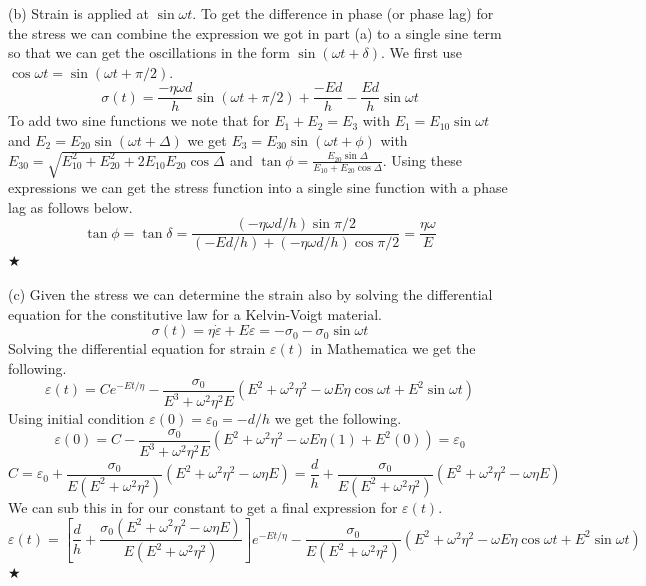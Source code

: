 \documentclass[preprint,12pt,authoryear]{elsarticle}
\begin{document}
(b) Strain is applied at $\sin{\omega t}$. To get the difference in phase (or phase lag) for the stress we can combine the expression we got in part (a) to a single sine term so that we can get the oscillations in the form $\sin{(\omega t + \delta)}$. We first use $\cos{\omega t} = \sin{(\omega t + \pi/2)}$.
\begin{equation}
    \sigma(t) = \frac{-\eta \omega d}{h}\sin{(\omega t + \pi/2)} + \frac{-Ed}{h} - \frac{Ed}{h}\sin{\omega t}
\end{equation}
To add two sine functions we note that for $E_1 + E_2 = E_3$ with $E_1 = E_{10}\sin{\omega t}$ and $E_2 = E_{20}\sin{(\omega t + \Delta)}$ we get $E_3 = E_{30}\sin{(\omega t + \phi)}$ with $E_{30} = \sqrt{E^2_{10} + E^2_{20} + 2E_{10}E_{20}\cos{\Delta}}$ and $\tan{\phi} = \frac{E_{20}\sin{\Delta}}{E_{10}+E_{20}\cos{\Delta}}$. Using these expressions we can get the stress function into a single sine function with a phase lag as follows below.
\begin{equation}
    \tan{\phi} = \tan{\delta} = \frac{(-\eta\omega d/h)\sin{\pi/2}}{(-Ed/h) + (-\eta\omega d/h)\cos{\pi/2}} = \frac{\eta\omega}{E}
\end{equation}
\hspace*{\fill} $\bigstar$
\medskip

(c) Given the stress we can determine the strain also by solving the differential equation for the constitutive law for a Kelvin-Voigt material.
\begin{equation}
    \sigma(t) = \eta \dot{\varepsilon} + E\varepsilon = -\sigma_0 - \sigma_0\sin{\omega t}
\end{equation}
Solving the differential equation for strain $\varepsilon(t)$ in Mathematica we get the following.
\begin{equation}
    \varepsilon(t) = Ce^{-Et/\eta} - \frac{\sigma_0}{E^3 + \omega^2 \eta^2E}(E^2 + \omega^2 \eta^2 - \omega E \eta \cos{\omega t} + E^2 \sin{\omega t})
\end{equation}
Using initial condition $\varepsilon(0) = \varepsilon_0 = -d/h$ we get the following.
\begin{equation}
    \varepsilon(0) = C - \frac{\sigma_0}{E^3 + \omega^2 \eta^2E}(E^2 + \omega^2 \eta^2 - \omega E \eta (1) + E^2 (0)) = \varepsilon_0
\end{equation}
\begin{equation}
    C = \varepsilon_0 +  \frac{\sigma_0}{E(E^2 + \omega^2 \eta^2)}(E^2 + \omega^2 \eta^2 - \omega\eta E) = \frac{d}{h} +  \frac{\sigma_0}{E(E^2 + \omega^2 \eta^2)}(E^2 + \omega^2 \eta^2 - \omega\eta E)
\end{equation}
We can sub this in for our constant to get a final expression for $\varepsilon(t)$.
\begin{equation}
     \varepsilon(t) =\left[ \frac{d}{h} +  \frac{\sigma_0 (E^2 + \omega^2 \eta^2 - \omega\eta E)}{E(E^2 + \omega^2 \eta^2)}\right]  e^{-Et/\eta} - \frac{\sigma_0}{E(E^2 + \omega^2 \eta^2)}(E^2 + \omega^2 \eta^2 - \omega E \eta \cos{\omega t} + E^2 \sin{\omega t})
\end{equation}
\hspace*{\fill} $\bigstar$
\medskip
\end{document}
